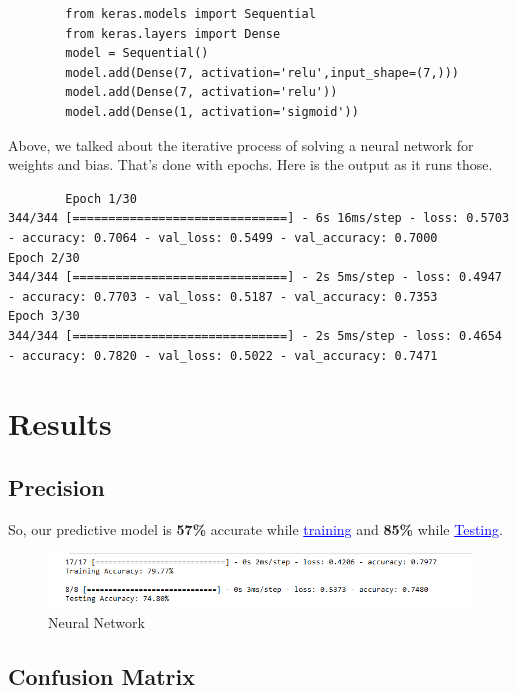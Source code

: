     \begin{lstlisting}
        from keras.models import Sequential
        from keras.layers import Dense
        model = Sequential()
        model.add(Dense(7, activation='relu',input_shape=(7,)))
        model.add(Dense(7, activation='relu'))
        model.add(Dense(1, activation='sigmoid'))   
    \end{lstlisting}
    Above, we talked about the iterative process of solving a neural network for weights and bias.
     That’s done with epochs. Here is the output as it runs those.    
     \begin{lstlisting}
        Epoch 1/30
344/344 [==============================] - 6s 16ms/step - loss: 0.5703 - accuracy: 0.7064 - val_loss: 0.5499 - val_accuracy: 0.7000
Epoch 2/30
344/344 [==============================] - 2s 5ms/step - loss: 0.4947 - accuracy: 0.7703 - val_loss: 0.5187 - val_accuracy: 0.7353
Epoch 3/30
344/344 [==============================] - 2s 5ms/step - loss: 0.4654 - accuracy: 0.7820 - val_loss: 0.5022 - val_accuracy: 0.7471    
    \end{lstlisting}
    

\section{Results}
\label{chap:results}

\subsection{Precision}
\label{sec:Precision}

So, our predictive model is \textbf{57\% } accurate while \textcolor{blue}{\underline{training}} and \textbf{85\% } while \textcolor{blue}{\underline {Testing}}.

\begin{figure}[htp]
    \centering
    \includegraphics[width=1.1\textwidth]{images/accuracy.png}
    \caption{Neural Network }
    \label{fig:example4}
\end{figure}

\newpage
\subsection{Confusion Matrix}
\label{sec:Confusion Matrix}

